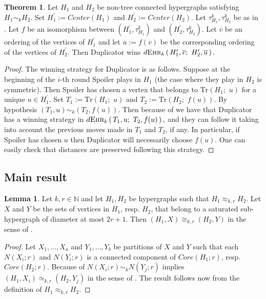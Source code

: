 \documentclass[12pt,notitlepage,a4paper]{article}
\theoremstyle{definition}
\newtheorem{theorem}{Theorem}[section]
\newtheorem{lemma}{Lemma}[section]
\newcommand{\N}{\mathbb{N}}
\newcommand{\ehr}{\textsc{Ehr}}
\newcommand{\sep}{\noindent\rule{2cm}{0.4pt}}
\begin{document}
	\begin{theorem} \label{thm:strategyaux}
		Let $H_1$ and $H_2$ be non-tree 
		connected hypergraphs satisfying
		$H_1\sim_k H_2$. 
		Set $H^\prime_1:= Center(H_1)$ and 
		$H^\prime_2:= Center(H_2)$. Let 
		$\tau^k_{H_1}, \tau^k_{H_2}$ be as in
		.
		Let $f$ be an isomorphism
		between $( H^\prime_1,\tau^k_{H_1})$ and 
		$(H^\prime_2,\tau^k_{H_2})$. Let $\overline{v}$ 
		be an ordering of the vertices of $H^\prime_1$ and let
		$\overline{u}:=f(\overline{v})$ be the corresponding
		ordering of the vertices of $H^\prime_2$. Then
		Duplicator wins 
		$	d\ehr_{k}\left(\,
		H^\prime_1,\overline{v};\,\,
		H^\prime_2,\overline{u}\,
		\right).
		$
	\end{theorem}
	\begin{proof}
		The winning strategy for Duplicator is as follows. 
		Suppose at the beginning of the $i$-th round
		Spoiler plays in $H_1$ (the case where they play in
		$H_2$ is symmetric). Then Spoiler has chosen a vertex 
		that belongs to $\mathrm{Tr}(H_1;\,\,u)$ for a unique
		$u\in H^\prime_1$. 
		Set $T_1:=\mathrm{Tr}\left(H_1;\,\,u\right)$ and
		$T_2:=\mathrm{Tr}\left(H_2;\,\,f(u)\right)$.
		By hypothesis
		$(T_1,u)\sim_k (T_2,f(u))$. 
		Then because of  we have that
		Duplicator has a winning strategy in
		$
		d\ehr_{k}\left(\,
		T_1,u; \, \, T_2, f(u)\,\right),
		$
		and they can follow it taking into account the previous
		moves made in $T_1$ and $T_2$, if any. In particular, 
		if Spoiler has chosen
		$u$ then Duplicator will necessarily choose $f(u)$.
		One can easily check that distances are preserved
		following this strategy. 
	\end{proof}
		
\subsection{Main result} \label{sec:Core}




\begin{lemma} \label{lem:aux1}
	Let $k,r\in \N$ and let $H_1, H_2$ be hypergraphs such that 
	$H_1\approx_{k,r} H_2$. Let $X$ and $Y$ be the
	sets of vertices in $H_1$, resp. $H_2$, that
	belong to a saturated sub-hypergraph of diameter 
	at most $2r+1$. Then $(H_1,X)\cong_{k,r} (H_2,Y)$ in the sense of
	.
\end{lemma}
\begin{proof}
	Let $X_1,\dots, X_a$ and $Y_1,\dots, Y_b$ be partitions of
	$X$ and $Y$ such that each $N(X_i;r)$ and $N(Y_i;r)$ is 
	a connected component of $Core(H_1;r)$, resp. $Core(H_2;r)$.
	Because of 
	$N(X_i;r)\sim_k N(Y_j;r)$ implies 
	$(H_1,X_i)\simeq_{k,r} (H_2,Y_j)$ in the sense of
	. The result follows now from
	 the definition of $H_1\approx_{k,r}H_2$.	
\end{proof}
\end{document}
